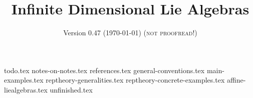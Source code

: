 \documentclass
[numbers=enddot,12pt,final,onecolumn,notitlepage]{amsbook}%
\begin{document}
\title{Infinite Dimensional Lie Algebras}
\date{Version 0.47 (\today) (\textsc{not proofread}!)}


\maketitle
\tableofcontents
\mbox{}

\printnomenclature

{todo.tex}
{notes-on-notes.tex}
{references.tex}
{general-conventions.tex}
{main-examples.tex}
{reptheory-generalities.tex}
{reptheory-concrete-examples.tex}
{affine-liealgebras.tex}
{unfinished.tex}
\end{document}
